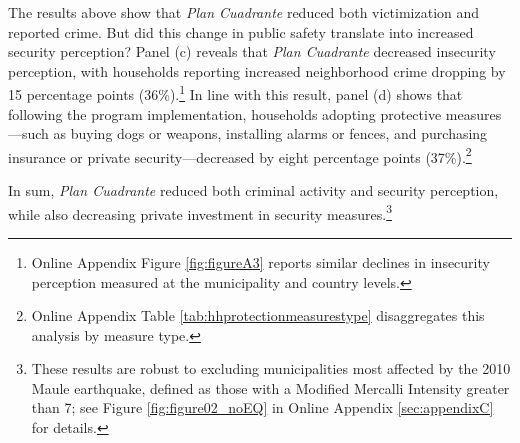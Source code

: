 The results above show that \emph{Plan Cuadrante} reduced both victimization and reported crime. But did this change in public safety translate into increased security perception? Panel (c) reveals that \emph{Plan Cuadrante} decreased insecurity perception, with households reporting increased neighborhood crime dropping by 15 percentage points (36\%).\footnote{Online Appendix Figure \ref{fig:figureA3} reports similar declines in insecurity perception measured at the municipality and country levels.} In line with this result, panel (d) shows that following the program implementation, households adopting protective measures---such as buying dogs or weapons, installing alarms or fences, and purchasing insurance or private security---decreased by eight percentage points (37\%).\footnote{Online Appendix Table \ref{tab:hhprotectionmeasurestype} disaggregates this analysis by measure type.}

In sum, \emph{Plan Cuadrante} reduced both criminal activity and security perception, while also decreasing private investment in security measures.\footnote{These results are robust to excluding municipalities most affected by the 2010 Maule earthquake, defined as those with a Modified Mercalli Intensity greater than 7; see Figure \ref{fig:figure02_noEQ} in Online Appendix \ref{sec:appendixC} for details.}




